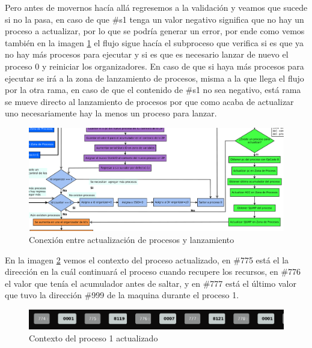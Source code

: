 \documentclass[letterpaper,12pt,oneside]{book}
\begin{document}
		
		Pero antes de movernos hacía allá regresemos a la validación y veamos que sucede si no la pasa, en caso de que \#s1 tenga un valor negativo significa
		que no hay un proceso a actualizar, por lo que se podría generar un error, por ende como vemos también en la imagen \ref{fig:diagConectActLanzamiento}
		el flujo sigue hacía el subproceso que verifica si es que ya no hay más procesos para ejecutar y si es que es necesario lanzar de nuevo el proceso
		0 y reiniciar los organizadores. En caso de que si haya más procesos para ejecutar se irá a la zona de lanzamiento de procesos, misma a la que llega
		el flujo por la otra rama, en caso de que el contenido de \#s1 no sea negativo, está rama se mueve directo al lanzamiento de procesos por que
		como acaba de actualizar uno necesariamente hay la menos un proceso para lanzar.
		
		\begin{figure}[ht]		
			\centering
			\includegraphics[scale=0.35]{media/CARDIACC/diagConectActLanzamiento.png}
			\caption{ Conexión entre actualización de procesos y lanzamiento}
			\label{fig:diagConectActLanzamiento}
		\end{figure}		
		
		
		En la imagen \ref{fig:proceso1ZPactualizadaP1} vemos el contexto del proceso actualizado, en \#775 está el la dirección en la cuál continuará
		el proceso cuando recupere los recursos, en \#776 el valor que tenía el acumulador antes de saltar, y en \#777 está el último valor que tuvo la 
		dirección \#999 de la maquina durante el proceso 1.
		
		
		\begin{figure}[h]		
			\centering
			\includegraphics[scale=0.5]{media/CARDIACC/proceso1ZPactualizadaP1.png}
			\caption{ Contexto del proceso 1 actualizado}
			\label{fig:proceso1ZPactualizadaP1}
		\end{figure}		
		
\end{document}
